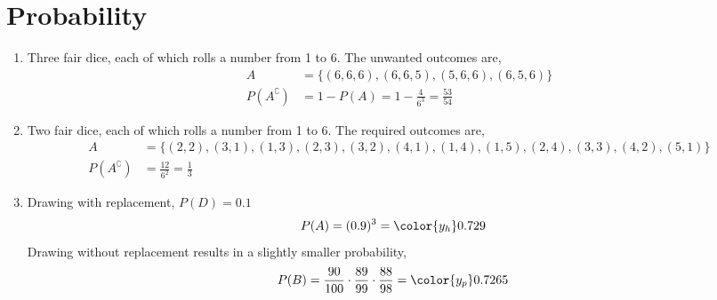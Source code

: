 \section{Probability}

\begin{enumerate}
    \item Three fair dice, each of which rolls a number from 1 to 6. The unwanted
          outcomes are,
          \begin{align}
              A                & = \{(6,6,6), (6,6,5), (5,6,6), (6,5,6)\} \\
              P(A^\complement) & = 1 - P(A) = 1 - \frac{4}{6^3}
              = \frac{53}{54}
          \end{align}

    \item Two fair dice, each of which rolls a number from 1 to 6. The required
          outcomes are,
          \begin{align}
              A                & = \{(2,2), (3,1), (1,3), (2,3), (3,2), (4,1), (1,4)
              , (1,5), (2,4), (3,3), (4,2), (5,1)\}                                  \\
              P(A^\complement) & = \frac{12}{6^2} = \frac{1}{3}
          \end{align}

    \item Drawing with replacement, $ P(D) = 0.1 $
          \begin{align}
              P(A) & = (0.9)^3 = \color{y_h}0.729
          \end{align}
          Drawing without replacement results in a slightly smaller probability,
          \begin{align}
              P(B) & = \frac{90}{100} \cdot \frac{89}{99} \cdot \frac{88}{98}
              = \color{y_p}0.7265
          \end{align}


\end{enumerate}
